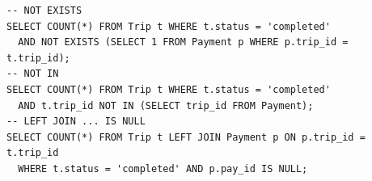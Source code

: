 \begin{lstlisting}[caption={Experiment 2: three anti-join formulations of the same count.}]
-- NOT EXISTS
SELECT COUNT(*) FROM Trip t WHERE t.status = 'completed'
  AND NOT EXISTS (SELECT 1 FROM Payment p WHERE p.trip_id = t.trip_id);
-- NOT IN
SELECT COUNT(*) FROM Trip t WHERE t.status = 'completed'
  AND t.trip_id NOT IN (SELECT trip_id FROM Payment);
-- LEFT JOIN ... IS NULL
SELECT COUNT(*) FROM Trip t LEFT JOIN Payment p ON p.trip_id = t.trip_id
  WHERE t.status = 'completed' AND p.pay_id IS NULL;
\end{lstlisting}
